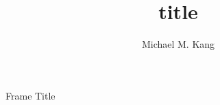 \documentclass[]{beamer}
\title{title}
\author{Michael M. Kang}
\date{}
\begin{document}
\maketitle

\begin{frame}{Frame Title}
    
\end{frame}
\end{document}
